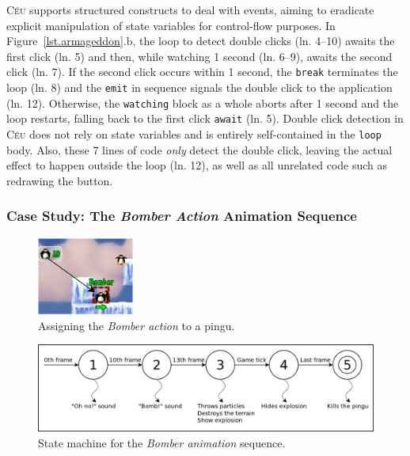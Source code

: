 \documentclass{vgtc}                          %
\newcommand{\CEU}{\textsc{C\'{e}u}\xspace}
\newcommand{\code}[1] {{\small{\texttt{#1}}}}
\begin{document}
\CEU supports structured constructs to deal with events, aiming to eradicate
explicit manipulation of state variables for control-flow purposes.
%
In Figure~\ref{lst.armageddon}.b, the loop to detect double clicks (ln. 4--10)
awaits the first click (ln. 5) and then, while watching 1 second (ln. 6--9),
awaits the second click (ln. 7).
If the second click occurs within 1 second, the \code{break} terminates the
loop (ln. 8) and the \code{emit} in sequence signals the double click to the
application (ln. 12).
Otherwise, the \code{watching} block as a whole aborts after 1 second  and the
loop restarts, falling back to the first click \code{await} (ln. 5).
%
Double click detection in \CEU does not rely on state variables and is entirely
self-contained in the \code{loop} body.
Also, these 7 lines of code \emph{only} detect the double click, leaving the
actual effect to happen outside the loop (ln. 12), as well as all unrelated
code such as redrawing the button.

\subsubsection{Case Study: The \emph{Bomber Action} Animation Sequence}
\label{sec.pats.fsms.2}


\begin{figure}[t]
\centering
\includegraphics[width=120px]{bomber-01}
\caption{ Assigning the \emph{Bomber action} to a pingu.
\label{fig.bomber.action}
}
\end{figure}

\begin{figure}[t]
\centering
\includegraphics[width=\columnwidth]{states}
\caption{ State machine for the \emph{Bomber animation} sequence.
\label{fig.bomber.fsm}
}
\end{figure}
\end{document}
